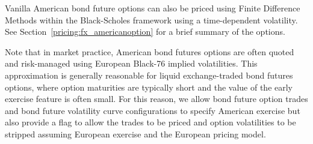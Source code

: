 Vanilla American bond future options can also be priced using Finite Difference Methods 
within the Black-Scholes framework using a time-dependent volatility. See 
Section~\ref{pricing:fx_americanoption} for a brief summary of the options.

Note that in market practice, American bond futures options are often quoted and risk-managed 
using European Black-76 implied volatilities. This approximation is generally reasonable for 
liquid exchange-traded bond futures options, where option maturities are typically short and 
the value of the early exercise feature is often small. For this reason, we allow bond 
future option trades and bond future volatility curve configurations to specify American 
exercise but also provide a flag to allow the trades to be priced and option volatilities 
to be stripped assuming European exercise and the European pricing model.
